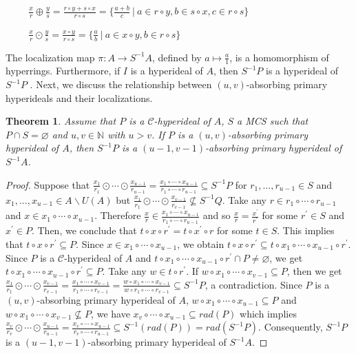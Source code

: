 \documentclass[preprint,review,10pt]{amsart}
\newtheorem{theorem}{Theorem}[section]
\theoremstyle{definition}
\theoremstyle{remark}
\numberwithin{equation}{section}
\begin{document}
$\hspace{1cm}\frac{x }{r } \oplus \frac{y}{s}=\frac{r \circ y+s \circ x}{r  \circ s}=\{\frac{a+b}{c} \ \vert \ a \in r  \circ y , b \in s \circ x , c \in r \circ s\}$

$\hspace{1cm}\frac{x }{r } \odot \frac{y}{s}=\frac{x  \circ y}{r  \circ s}=\{\frac{a}{b} \ \vert \ a \in x \circ y, b \in r  \circ s\}$

The localization map $\pi: A \longrightarrow S^{-1}A$, defined by $a \mapsto \frac{a}{1}$, is a homomorphism of hyperrings. Furthermore, if $I$ is a hyperideal of $A$, then $S^{-1}P$ is a hyperideal of $S^{-1}P$ \cite{Mena}. Next, we discuss the relationship between $(u, v)$-absorbing primary hyperideals and their localizations.
\begin{theorem} \label{vvv}
Assume that $P$ is a $\mathcal{C}$-hyperideal of $A$, $S$ a MCS such that $P \cap S = \varnothing$ and $u,v \in \mathbb{N}$ with $u >v$. If $P$ is a $(u, v)$-absorbing primary hyperideal of $A$, then $S^{-1}P$ is a $(u-1, v-1 )$-absorbing primary hyperideal of $S^{-1}A$. 
\end{theorem}
\begin{proof}
Suppose that  $\frac{x_1}{r_1} \odot \cdots \odot \frac{x_{u-1}
}{r_{u-1}}=\frac{x_1 \circ \cdots \circ x_{u-1}}{r_1 \circ \cdots \circ r_{u-1}} \subseteq S^{-1}P$ for $r_1,\ldots,r_{u-1} \in S$ and  $x_1, \ldots , x_{u-1} \in A \backslash U(A)$ but $\frac{x_1}{r_1} \odot \cdots \odot \frac{x_{v-1}}{r_{v-1}} \nsubseteq S^{-1}Q$. Take any $r \in r_1 \circ \cdots \circ r_{u-1}$ and $x \in x_1 \circ \cdots \circ x_{u-1}$. Therefore $\frac{x}{r} \in \frac{x_1 \circ \cdots \circ x_{u-1}}{r_1 \circ \cdots \circ r_{u-1}}$ and so $\frac{x}{r}=\frac{x^{\prime}}{r^{\prime}}$ for some $r^{\prime} \in S$ and $x^{\prime} \in P$. Then, we conclude that  $t \circ x \circ r^{\prime}=t \circ x^{\prime} \circ r$ for some $t \in S$. This implies that $t \circ x \circ r^{\prime} \subseteq P$. Since $x \in x_1 \circ \cdots \circ x_{u-1}$, we obtain $t \circ x \circ r^{\prime} \subseteq t \circ x_1 \circ \cdots \circ x_{u-1} \circ r^{\prime}$. Since $P$ is a $\mathcal{C}$-hyperideal of $A$ and $t \circ x_1 \circ \cdots \circ x_{u-1} \circ r^{\prime} \cap P \neq \varnothing$, we get  $t \circ x_1 \circ \cdots \circ x_{u-1}\circ r^{\prime} \subseteq P$.  Take any $w \in t \circ r^{\prime}$. If $w \circ x_1 \circ \cdots \circ x_{v-1} \subseteq P$, then we get $\frac{x_1}{r_1} \odot \cdots \odot \frac{x_{v-1}}{r_{v-1}}=\frac{x_1 \circ \cdots \circ x_{v-1}}{r_1 \circ \cdots \circ r_{v-1}}= \frac{w \circ x_1 \circ \cdots \circ x_{v-1}}{w \circ r_1 \circ \cdots \circ r_{v-1}}\subseteq S^{-1}P$, a contradiction.  Since $P$ is a $(u, v)$-absorbing primary hyperideal of $A$, $w \circ x_1 \circ \cdots \circ x_{u-1} \subseteq P$ and $w \circ x_1 \circ \cdots \circ x_{v-1} \nsubseteq P$, we have $ x_v \circ \cdots \circ x_{u-1} \subseteq rad(P)$ which implies $\frac{x_v}{r_v} \odot \cdots \odot \frac{x_{u-1}}{r_{u-1}}=\frac{x_v \circ \cdots \circ x_{u-1}}{r_v \circ \cdots \circ r_{u-1}} \subseteq S^{-1}(rad(P))=rad(S^{-1}P)$. Consequently,  $S^{-1}P$ is a $(u-1,v-1)$-absorbing primary hyperideal of $S^{-1}A$. 
\end{proof}
\end{document}
